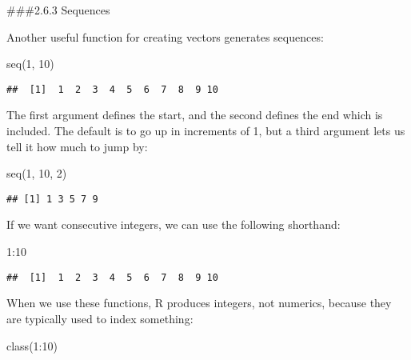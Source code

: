 \documentclass[
]{article}
\newenvironment{Shaded}{\begin{snugshade}}{\end{snugshade}}
\newcommand{\DecValTok}[1]{\textcolor[rgb]{0.00,0.00,0.81}{#1}}
\newcommand{\FunctionTok}[1]{\textcolor[rgb]{0.00,0.00,0.00}{#1}}
\newcommand{\NormalTok}[1]{#1}
\newcommand{\SpecialCharTok}[1]{\textcolor[rgb]{0.00,0.00,0.00}{#1}}
\begin{document}
\#\#\#2.6.3 Sequences

Another useful function for creating vectors generates sequences:

\begin{Shaded}
\begin{Highlighting}[]
\FunctionTok{seq}\NormalTok{(}\DecValTok{1}\NormalTok{, }\DecValTok{10}\NormalTok{)}
\end{Highlighting}
\end{Shaded}

\begin{verbatim}
##  [1]  1  2  3  4  5  6  7  8  9 10
\end{verbatim}

The first argument defines the start, and the second defines the end
which is included. The default is to go up in increments of 1, but a
third argument lets us tell it how much to jump by:

\begin{Shaded}
\begin{Highlighting}[]
\FunctionTok{seq}\NormalTok{(}\DecValTok{1}\NormalTok{, }\DecValTok{10}\NormalTok{, }\DecValTok{2}\NormalTok{)}
\end{Highlighting}
\end{Shaded}

\begin{verbatim}
## [1] 1 3 5 7 9
\end{verbatim}

If we want consecutive integers, we can use the following shorthand:

\begin{Shaded}
\begin{Highlighting}[]
\DecValTok{1}\SpecialCharTok{:}\DecValTok{10}
\end{Highlighting}
\end{Shaded}

\begin{verbatim}
##  [1]  1  2  3  4  5  6  7  8  9 10
\end{verbatim}

When we use these functions, R produces integers, not numerics, because
they are typically used to index something:

\begin{Shaded}
\begin{Highlighting}[]
\FunctionTok{class}\NormalTok{(}\DecValTok{1}\SpecialCharTok{:}\DecValTok{10}\NormalTok{)}
\end{Highlighting}
\end{Shaded}
\end{document}
